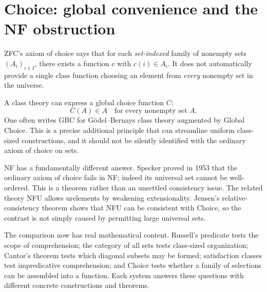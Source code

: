 \section{Choice: global convenience and the NF obstruction}

ZFC's axiom of choice says that for each \emph{set-indexed} family of nonempty sets \((A_i)_{i\in I}\), there exists a function \(c\) with \(c(i)\in A_i\). It does not automatically provide a single class function choosing an element from \emph{every} nonempty set in the universe.

A class theory can express a global choice function \(C\):
\[
 \boxed{C(A)\in A\quad\text{for every nonempty set }A.}
\]
One often writes GBC for Gödel--Bernays class theory augmented by Global Choice. This is a precise additional principle that can streamline uniform class-sized constructions, and it should not be silently identified with the ordinary axiom of choice on sets.

NF has a fundamentally different answer. Specker proved in 1953 that the ordinary axiom of choice fails in NF; indeed its universal set cannot be well-ordered. This is a theorem rather than an unsettled consistency issue. The related theory NFU allows urelements by weakening extensionality. Jensen's relative-consistency theorem shows that NFU can be consistent with Choice, so the contrast is not simply caused by permitting large universal sets.

The comparison now has real mathematical content. Russell's predicate tests the scope of comprehension; the category of all sets tests class-sized organization; Cantor's theorem tests which diagonal subsets may be formed; satisfaction classes test impredicative comprehension; and Choice tests whether a family of selections can be assembled into a function. Each system answers these questions with different concrete constructions and theorems.
